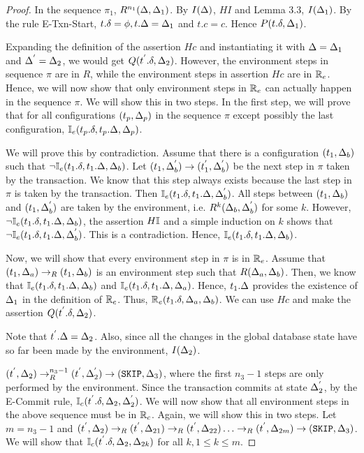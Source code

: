\documentclass[acmlarge,anonymous]{acmart}\settopmatter{printfolios=true}
\begin{document}
\begin{proof}
In the sequence $\pi_1$, $R^{n_1}(\Delta, \Delta_1)$. By $I(\Delta)$, $HI$ and Lemma 3.3, $I(\Delta_1)$. By the rule E-Txn-Start, $t.\delta = \phi, t.\Delta = \Delta_1$ and $t.c = c$. Hence $P(t.\delta, \Delta_1)$.

Expanding the definition of the assertion $Hc$ and instantiating it with $\Delta = \Delta_1$ and $\Delta^{'} = \Delta_2$, we would get $Q(t^{'}.\delta, \Delta_2)$. However, the environment steps in sequence $\pi$ are in $R$, while the environment steps in assertion $Hc$ are in $\mathbb{R}_e$. Hence, we will now show that only environment steps in $\mathbb{R}_e$ can actually happen in the sequence $\pi$. We will show this in two steps. In the first step, we will prove that for all configurations $(t_p, \Delta_p)$ in the sequence $\pi$ except possibly the last configuration, $\mathbb{I}_e(t_p.\delta, t_p.\Delta, \Delta_p)$. 

We will prove this by contradiction. Assume that there is a configuration $(t_1, \Delta_b)$ such that $\neg \mathbb{I}_e( t_1.\delta, t_1.\Delta, \Delta_b)$. Let $(t_1, \Delta_{b}^{'}) \rightarrow (t_{1}^{'}, \Delta_{b}^{'})$ be the next step in $\pi$ taken by the transaction. We know that this step always exists because the last step in $\pi$ is taken by the transaction.  Then $\mathbb{I}_e(t_1.\delta, t_1.\Delta, \Delta_{b}^{'})$. All steps between $(t_1, \Delta_b)$ and $(t_1, \Delta_{b}^{'})$ are taken by the environment, i.e. $R^{k}(\Delta_b, \Delta_{b}^{'})$ for some $k$. However,  $\neg \mathbb{I}_e(t_1.\delta, t_1.\Delta, \Delta_b)$, the assertion $H\mathbb{I}$ and a simple induction on $k$ shows that $\neg \mathbb{I}_e(t_1.\delta, t_1.\Delta, \Delta_{b}^{'})$. This is a contradiction. Hence, $\mathbb{I}_e(t_1.\delta, t_1.\Delta, \Delta_b)$. 

Now, we will show that every environment step in $\pi$ is in $\mathbb{R}_e$. Assume that $(t_1, \Delta_a) \rightarrow_R (t_1, \Delta_b)$ is an environment step such that $R(\Delta_a, \Delta_b)$. Then, we know that $\mathbb{I}_e(t_1.\delta, t_1.\Delta, \Delta_b)$ and $\mathbb{I}_e(t_1.\delta, t_1.\Delta, \Delta_a)$. Hence, $t_1.\Delta$ provides the existence of $\Delta_1$ in the definition of $\mathbb{R}_e$. Thus, $\mathbb{R}_e(t_1.\delta, \Delta_a, \Delta_b)$. We can use $Hc$ and make the assertion $Q(t^{'}.\delta, \Delta_2)$.

Note that $t^{'}.\Delta = \Delta_2$. Also, since all the changes in the global database state have so far been made by the environment, $I(\Delta_2)$.

$(t^{'}, \Delta_2) \rightarrow_{R}^{n_3 - 1} (t^{'}, \Delta_{2}^{'}) \rightarrow (\texttt{SKIP}, \Delta_3)$, where the first $n_3-1$ steps are only performed by the environment. Since the transaction commits at state $\Delta_{2}^{'}$, by the E-Commit rule, $\mathbb{I}_c(t^{'}.\delta, \Delta_2, \Delta_{2}^{'})$. We will now show that all environment steps in the above sequence must be in $\mathbb{R}_c$. Again, we will show this in two steps. Let $m = n_3 - 1$ and $(t^{'}, \Delta_2) \rightarrow_R (t^{'}, \Delta_{21}) \rightarrow_R (t^{'}, \Delta_{22}) \ldots \rightarrow_R (t^{'}, \Delta_{2m}) \rightarrow (\texttt{SKIP}, \Delta_3)$. We will show that $\mathbb{I}_c(t^{'}.\delta, \Delta_2, \Delta_{2k})$ for all $k, 1 \leq k \leq m$. 


\end{proof}
\end{document}

